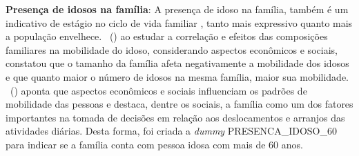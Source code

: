 \begin{compactitem}
\item \textbf{Presença de idosos na família}: A presença de idoso na família, também é um indicativo de estágio no ciclo de vida familiar \cite{ORTUZAR1994}, tanto mais expressivo quanto mais a população envelhece. 
\ (\citeyear{OLIVEIRA2014}) ao estudar a correlação e efeitos das composições familiares na
mobilidade do idoso, considerando aspectos econômicos e sociais, constatou que o tamanho da família afeta negativamente a mobilidade dos idosos e que quanto maior o número de idosos na mesma família, maior sua mobilidade. 
\ (\citeyear{VASCONCELLOS2001}) aponta que aspectos econômicos e sociais influenciam os padrões de mobilidade das pessoas e destaca, dentre os sociais, a família como um dos fatores importantes na tomada de decisões em relação aos deslocamentos e arranjos das atividades diárias. Desta forma, foi criada a \textit{dummy} PRESENCA_IDOSO_60 para indicar se a família conta com pessoa idosa com mais de 60 anos.
\end{compactitem}
